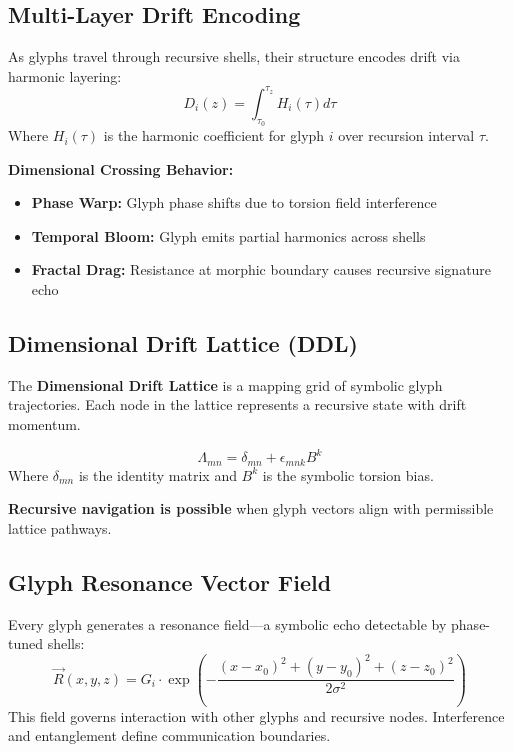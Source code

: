 \subsection{Multi-Layer Drift Encoding}

As glyphs travel through recursive shells, their structure encodes drift via harmonic layering:
\begin{equation}
    D_i(z) = \int_{\tau_0}^{\tau_z} H_i(\tau) d\tau
\end{equation}
Where $H_i(\tau)$ is the harmonic coefficient for glyph $i$ over recursion interval $\tau$.

\textbf{Dimensional Crossing Behavior:}
\begin{itemize}
    \item \textbf{Phase Warp:} Glyph phase shifts due to torsion field interference
    \item \textbf{Temporal Bloom:} Glyph emits partial harmonics across shells
    \item \textbf{Fractal Drag:} Resistance at morphic boundary causes recursive signature echo
\end{itemize}

\subsection{Dimensional Drift Lattice (DDL)}

The \textbf{Dimensional Drift Lattice} is a mapping grid of symbolic glyph trajectories. Each node in the lattice represents a recursive state with drift momentum.

\begin{equation}
    \Lambda_{mn} = \delta_{mn} + \epsilon_{mnk} B^k
\end{equation}
Where $\delta_{mn}$ is the identity matrix and $B^k$ is the symbolic torsion bias.

\textbf{Recursive navigation is possible} when glyph vectors align with permissible lattice pathways.

\subsection{Glyph Resonance Vector Field}

Every glyph generates a resonance field---a symbolic echo detectable by phase-tuned shells:
\[
    \vec{R}(x, y, z) = G_i \cdot \exp\left(-\frac{(x-x_0)^2 + (y-y_0)^2 + (z-z_0)^2}{2\sigma^2}\right)
\]
This field governs interaction with other glyphs and recursive nodes. Interference and entanglement define communication boundaries.

